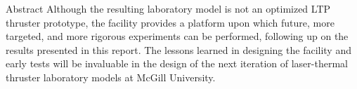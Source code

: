 \begin{plainchp}{Abstract}
    Although the resulting laboratory model is not an optimized LTP thruster prototype, the facility provides a platform upon which future, more targeted, and more rigorous experiments can be performed, following up on the results presented in this report. The lessons learned in designing the facility and early tests will be invaluable in the design of the next iteration of laser-thermal thruster laboratory models at McGill University.

\end{plainchp}